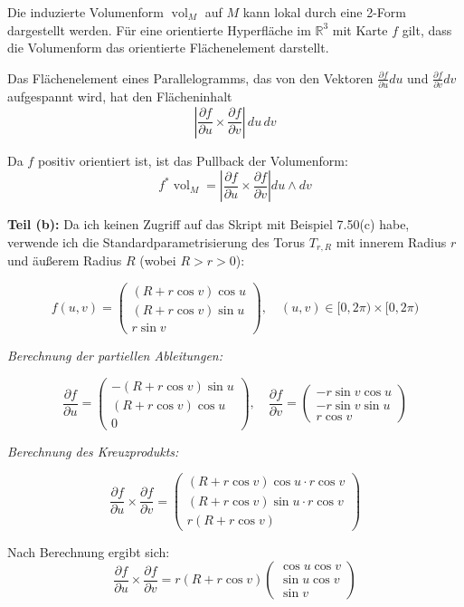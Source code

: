 \documentclass{article}
\DeclareMathOperator{\vol}{vol}
\newcommand{\R}{\mathbb{R}}
\newcommand{\del}{\partial}
\begin{document}
Die induzierte Volumenform $\vol_M$ auf $M$ kann lokal durch eine 2-Form dargestellt werden. Für eine orientierte Hyperfläche im $\R^3$ mit Karte $f$ gilt, dass die Volumenform das orientierte Flächenelement darstellt.

Das Flächenelement eines Parallelogramms, das von den Vektoren $\frac{\del f}{\del u} du$ und $\frac{\del f}{\del v} dv$ aufgespannt wird, hat den Flächeninhalt
$$\left|\frac{\del f}{\del u} \times \frac{\del f}{\del v}\right| \, du \, dv$$

Da $f$ positiv orientiert ist, ist das Pullback der Volumenform:
$$f^* \vol_M = \left| \frac{\del f}{\del u}\times\frac{\del f}{\del v} \right| du \wedge dv$$

\textbf{Teil (b):} Da ich keinen Zugriff auf das Skript mit Beispiel 7.50(c) habe, verwende ich die Standardparametrisierung des Torus $T_{r,R}$ mit innerem Radius $r$ und äußerem Radius $R$ (wobei $R > r > 0$):

$$f(u,v) = \begin{pmatrix}
(R + r\cos v)\cos u \\
(R + r\cos v)\sin u \\
r\sin v
\end{pmatrix}, \quad (u,v) \in [0,2\pi) \times [0,2\pi)$$

\textit{Berechnung der partiellen Ableitungen:}

$$\frac{\del f}{\del u} = \begin{pmatrix}
-(R + r\cos v)\sin u \\
(R + r\cos v)\cos u \\
0
\end{pmatrix}, \quad
\frac{\del f}{\del v} = \begin{pmatrix}
-r\sin v \cos u \\
-r\sin v \sin u \\
r\cos v
\end{pmatrix}$$

\textit{Berechnung des Kreuzprodukts:}

$$\frac{\del f}{\del u} \times \frac{\del f}{\del v} = \begin{pmatrix}
(R + r\cos v)\cos u \cdot r\cos v \\
(R + r\cos v)\sin u \cdot r\cos v \\
r(R + r\cos v)
\end{pmatrix}$$

Nach Berechnung ergibt sich:
$$\frac{\del f}{\del u} \times \frac{\del f}{\del v} = r(R + r\cos v)\begin{pmatrix}
\cos u \cos v \\
\sin u \cos v \\
\sin v
\end{pmatrix}$$
\end{document}
